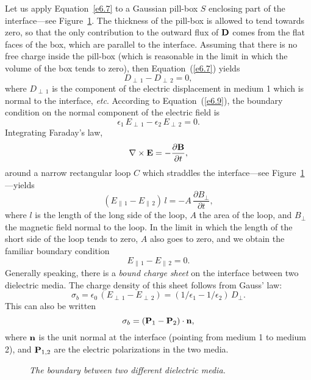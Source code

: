 Let us apply Equation~\ref{e6.7} to  a Gaussian pill-box $S$ enclosing part of the interface---see Figure~\ref{f43a}. The thickness of the pill-box
is allowed to tend towards zero, so that the only contribution to
the outward flux of ${\bf D}$ comes from the flat faces of the box, which are
parallel to the interface.  Assuming that there
is no free charge inside the pill-box  (which is reasonable in the limit
in which the volume of the box tends to zero), then Equation~(\ref{e6.7})
yields
\begin{equation}\label{e6.13}
D_{\perp\,1}-D_{\perp\,2} = 0,
\end{equation}
where $D_{\perp\,1}$ is the component of the electric displacement in medium 1 which is normal to the interface, {\em etc}. 
According to Equation~(\ref{e6.9}), the boundary condition on the
normal component of the electric field is
\begin{equation}
\epsilon_1\,E_{\perp\,1}- \epsilon_2\,E_{\perp\,2} = 0.
\end{equation}
Integrating Faraday's law,
\begin{equation}
\nabla\times {\bf E} = -\frac{\partial {\bf B}}{\partial t},
\end{equation}
around a narrow rectangular loop $C$ which straddles the interface---see Figure~\ref{f43a}---yields
\begin{equation}
(E_{\parallel\,1} - E_{\parallel\,2})\,l = -A\,\frac{\partial B_\perp}{\partial t},
\end{equation}
where $l$ is the length of the long side of the loop, $A$  the area of the loop, and $B_\perp$ the magnetic field normal to the loop. In the limit in which the length of the short side of the loop tends to zero, $A$ also goes to zero, and we obtain
the familiar boundary condition
\begin{equation}
E_{\parallel\,1}-E_{\parallel\,2} = 0.
\end{equation}
Generally speaking, there is a {\em bound charge sheet}\/ on the interface between two dielectric media. The charge density of this sheet follows from Gauss' law:
\begin{equation}
\sigma_b = \epsilon_0\,(E_{\perp\,1}-E_{\perp\,2}) = (1/\epsilon_1-1/\epsilon_2)\,D_{\perp}.
\end{equation}
This can also be written
\begin{equation}\label{e5.21a}
\sigma_b = ({\bf P}_1-{\bf P}_2)\cdot {\bf n},
\end{equation}
where ${\bf n}$ is the unit normal at the interface (pointing from medium 1 to medium 2), and ${\bf P}_{1,2}$ are the electric polarizations in the two media.
\begin{figure}
\epsfysize=1.75in
\centerline{}
\caption{\em The boundary between two different dielectric media.}\label{f43a}
\end{figure}

